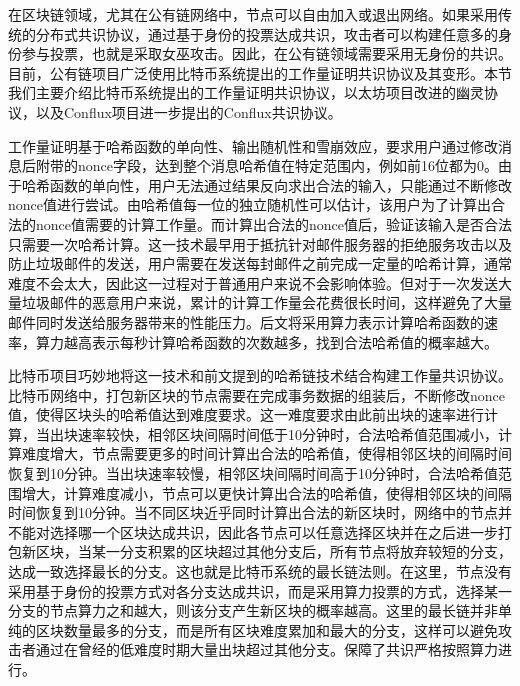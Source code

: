 在区块链领域，尤其在公有链网络中，节点可以自由加入或退出网络。如果采用传统的分布式共识协议，通过基于身份的投票达成共识，攻击者可以构建任意多的身份参与投票，也就是采取女巫攻击。因此，在公有链领域需要采用无身份的共识。目前，公有链项目广泛使用比特币系统提出的工作量证明共识协议及其变形。本节我们主要介绍比特币系统提出的工作量证明共识协议，以太坊项目改进的幽灵协议，以及Conflux项目进一步提出的Conflux共识协议。

工作量证明基于哈希函数的单向性、输出随机性和雪崩效应，要求用户通过修改消息后附带的nonce字段，达到整个消息哈希值在特定范围内，例如前16位都为0。由于哈希函数的单向性，用户无法通过结果反向求出合法的输入，只能通过不断修改nonce值进行尝试。由哈希值每一位的独立随机性可以估计，该用户为了计算出合法的nonce值需要的计算工作量。而计算出合法的nonce值后，验证该输入是否合法只需要一次哈希计算。这一技术最早用于抵抗针对邮件服务器的拒绝服务攻击以及防止垃圾邮件的发送，用户需要在发送每封邮件之前完成一定量的哈希计算，通常难度不会太大，因此这一过程对于普通用户来说不会影响体验。但对于一次发送大量垃圾邮件的恶意用户来说，累计的计算工作量会花费很长时间，这样避免了大量邮件同时发送给服务器带来的性能压力。后文将采用算力表示计算哈希函数的速率，算力越高表示每秒计算哈希函数的次数越多，找到合法哈希值的概率越大。

比特币项目巧妙地将这一技术和前文提到的哈希链技术结合构建工作量共识协议。比特币网络中，打包新区块的节点需要在完成事务数据的组装后，不断修改nonce值，使得区块头的哈希值达到难度要求。这一难度要求由此前出块的速率进行计算，当出块速率较快，相邻区块间隔时间低于10分钟时，合法哈希值范围减小，计算难度增大，节点需要更多的时间计算出合法的哈希值，使得相邻区块的间隔时间恢复到10分钟。当出块速率较慢，相邻区块间隔时间高于10分钟时，合法哈希值范围增大，计算难度减小，节点可以更快计算出合法的哈希值，使得相邻区块的间隔时间恢复到10分钟。当不同区块近乎同时计算出合法的新区块时，网络中的节点并不能对选择哪一个区块达成共识，因此各节点可以任意选择区块并在之后进一步打包新区块，当某一分支积累的区块超过其他分支后，所有节点将放弃较短的分支，达成一致选择最长的分支。这也就是比特币系统的最长链法则。在这里，节点没有采用基于身份的投票方式对各分支达成共识，而是采用算力投票的方式，选择某一分支的节点算力之和越大，则该分支产生新区块的概率越高。这里的最长链并非单纯的区块数量最多的分支，而是所有区块难度累加和最大的分支，这样可以避免攻击者通过在曾经的低难度时期大量出块超过其他分支。保障了共识严格按照算力进行。

